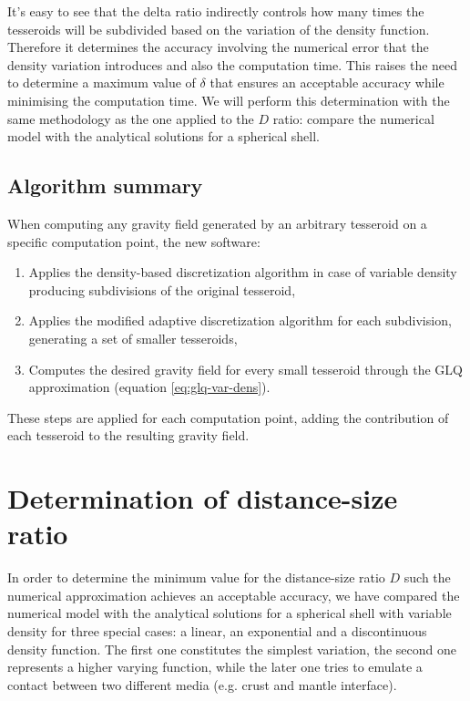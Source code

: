 \documentclass[extra]{gji}
\begin{document}
It's easy to see that the delta ratio indirectly controls how many times the tesseroids will be subdivided based on the variation of the density function.
Therefore it determines the accuracy involving the numerical error that the density variation introduces and also the computation time.
This raises the need to determine a maximum value of $\delta$ that ensures an acceptable accuracy while minimising the computation time.
We will perform this determination with the same methodology as the one applied to the $D$ ratio: compare the numerical model with the analytical solutions for a spherical shell.


\subsection{Algorithm summary}

When computing any gravity field generated by an arbitrary tesseroid on a specific computation point, the new software:

\begin{enumerate}
    \renewcommand{\theenumi}{(\arabic{enumi})}
    \item Applies the density-based discretization algorithm in case of variable density producing subdivisions of the original tesseroid,
    \item Applies the modified adaptive discretization algorithm for each subdivision, generating a set of smaller tesseroids,
    \item Computes the desired gravity field for every small tesseroid through the GLQ approximation (equation \ref{eq:glq-var-dens}).
\end{enumerate}

These steps are applied for each computation point, adding the contribution of each tesseroid to the resulting gravity field.


\section{Determination of distance-size ratio}

In order to determine the minimum value for the distance-size ratio $D$ such the numerical approximation achieves an acceptable accuracy, we have compared the numerical model with the analytical solutions for a spherical shell with variable density for three special cases: a linear, an exponential and a discontinuous density function.
The first one constitutes the simplest variation, the second one represents a higher varying function, while the later one tries to emulate a contact between two different media (e.g. crust and mantle interface).
\end{document}
